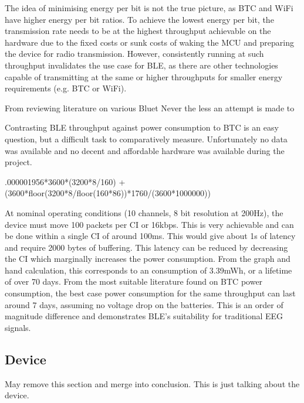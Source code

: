 \documentclass[]{article}
\begin{document}
The idea of minimising energy per bit is not the true picture, as \ac{BTC} and WiFi have higher energy per bit ratios. To achieve the lowest energy per bit, the transmission rate needs to be at the highest throughput achievable on the hardware due to the fixed costs or sunk costs of waking the \ac{MCU} and preparing the device for radio transmission. However, consistently running at such throughput invalidates the use case for \ac{BLE}, as there are other technologies capable of transmitting at the same or higher throughputs for smaller energy requirements (e.g. \ac{BTC} or WiFi). 

From reviewing literature on various Bluet
Never the less an attempt is made to 

Contrasting \ac{BLE} throughput against power consumption to \ac{BTC} is an easy question, but a difficult task to comparatively measure. Unfortunately no data was available and no decent and affordable hardware was available during the project. 


.000001956*3600*(3200*8/160) + (3600*floor(3200*8/floor(160*86))*1760/(3600*1000000))

At nominal operating conditions (10 channels, 8 bit resolution at 200Hz), the device must move 100 packets per \ac{CI} or 16kbps. This is very achievable and can be done within a single \ac{CI} of around 100ms. This would give about 1s of latency and require 2000 bytes of buffering. This latency can be reduced by decreasing the \ac{CI} which marginally increases the power consumption. From the graph and hand calculation, this corresponds to an consumption of 3.39mWh, or a lifetime of over 70 days. From the most suitable literature found \cite{rahuli} on \ac{BTC} power consumption, the best case power consumption for the same throughput can last around 7 days, assuming no voltage drop on the batteries. This is an order of magnitude difference and demonstrates \ac{BLE}'s suitability for traditional \ac{EEG} signals. 












\subsection{Device}


May remove this section and merge into conclusion. This is just talking about the device.
\end{document}
